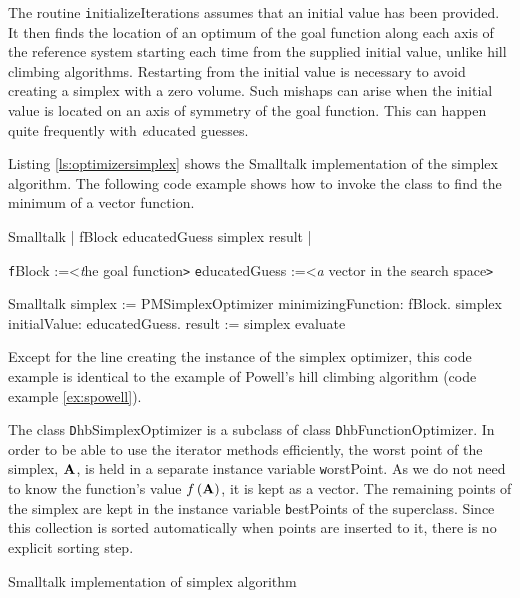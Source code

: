 The routine {\texttt initializeIterations} assumes that an initial
value has been provided. It then finds the location of an optimum
of the goal function along each axis of the reference system
starting each time from the supplied initial value, unlike hill
climbing algorithms. Restarting from the initial value is
necessary to avoid creating a simplex with a zero volume. Such
mishaps can arise when the initial value is located on an axis of
symmetry of the goal function.
This can happen quite frequently with {\textsl educated guesses}.

Listing \ref{ls:optimizersimplex} shows
the Smalltalk implementation of the simplex algorithm. The
following code example shows how to invoke the class to find the
minimum of a vector function.

\begin{displaycode}{Smalltalk}
 | fBlock educatedGuess simplex result |
\end{displaycode}
 {\texttt fBlock :=<\textsl the goal function\texttt >}\hfil\break
 {\texttt educatedGuess :=<\textsl a vector in the search space\texttt >}
\begin{displaycode}{Smalltalk}
 simplex := PMSimplexOptimizer minimizingFunction: fBlock.
 simplex initialValue: educatedGuess.
 result := simplex evaluate
\end{displaycode}
Except for the line creating the instance of the simplex
optimizer, this code example is identical to the example of
Powell's hill climbing algorithm (code example \ref{ex:spowell}).

The class {\texttt DhbSimplexOptimizer} is a subclass of class {\texttt
DhbFunctionOptimizer}. In order to be able to use the iterator
methods efficiently, the worst point of the simplex, ${\textbf A}$, is
held in a separate instance variable {\texttt worstPoint}. As we do
not need to know the function's value $f\left({\textbf A}\right)$, it
is kept as a vector. The remaining points of the simplex are kept
in the instance variable {\texttt bestPoints} of the superclass. Since
this collection is sorted automatically when points are inserted
to it, there is no explicit sorting step.

\begin{listing} Smalltalk implementation of simplex algorithm
\label{ls:optimizersimplex}

\end{listing}

